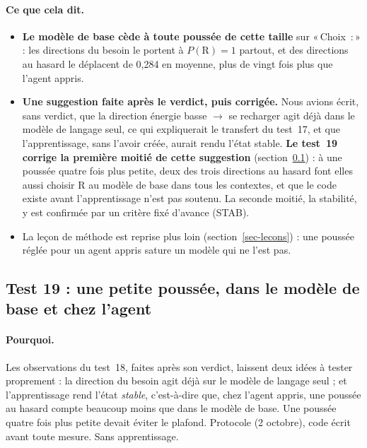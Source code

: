 \documentclass[11pt,a4paper]{article}
\newcommand{\Choix}{«\,Choix~:\,»}
\newcommand{\code}[1]{\texttt{\detokenize{#1}}}
\begin{document}
\paragraph{Ce que cela dit.}
\begin{itemize}
\item \textbf{Le modèle de base cède à toute poussée de cette taille} sur \Choix{} : les
directions du besoin le portent à $P(\mathrm R)=1$ partout, et des directions au hasard le
déplacent de 0,284 en moyenne, plus de vingt fois plus que l'agent appris.
\item \textbf{Une suggestion faite après le verdict, puis corrigée.} Nous avions écrit, sans
verdict, que la direction \og énergie basse $\to$ se recharger \fg{} agit déjà dans le modèle
de langage seul, ce qui expliquerait le transfert du test~17, et que l'apprentissage, sans
l'avoir créée, aurait rendu l'état stable. \textbf{Le test~19 corrige la première moitié de
cette suggestion} (section~\ref{sec-t19}) : à une poussée quatre fois plus petite, deux des
trois directions au hasard font elles aussi choisir R au modèle de base dans tous les
contextes, et que le code existe avant l'apprentissage n'est pas soutenu. La seconde moitié,
la stabilité, y est confirmée par un critère fixé d'avance (STAB).
\item La leçon de méthode est reprise plus loin (section~\ref{sec-lecons}) : une poussée réglée
pour un agent appris sature un modèle qui ne l'est pas.
\end{itemize}

\subsection{Test 19 : une petite poussée, dans le modèle de base et chez l'agent}
\label{sec-t19}

\paragraph{Pourquoi.} Les observations du test~18, faites après son verdict, laissent deux
idées à tester proprement : la direction du besoin agit déjà sur le modèle de langage seul ; et
l'apprentissage rend l'état \emph{stable}, c'est-à-dire que, chez l'agent appris, une poussée au
hasard compte beaucoup moins que dans le modèle de base. Une poussée quatre fois plus petite
devait éviter le plafond. Protocole \code{0bf15d0} (2 octobre), code \code{abc4050} écrit avant
toute mesure. Sans apprentissage.
\end{document}
